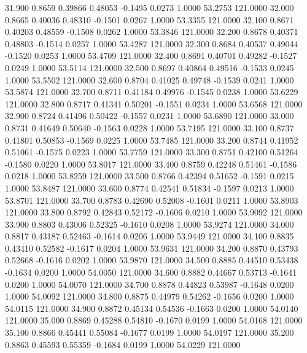   31.900   0.8659   0.39866   0.48053  -0.1495   0.0273   1.0000  53.2753 121.0000
  32.000   0.8665   0.40036   0.48310  -0.1501   0.0267   1.0000  53.3355 121.0000
  32.100   0.8671   0.40203   0.48559  -0.1508   0.0262   1.0000  53.3846 121.0000
  32.200   0.8678   0.40371   0.48803  -0.1514   0.0257   1.0000  53.4287 121.0000
  32.300   0.8684   0.40537   0.49044  -0.1520   0.0253   1.0000  53.4709 121.0000
  32.400   0.8691   0.40701   0.49282  -0.1527   0.0249   1.0000  53.5114 121.0000
  32.500   0.8697   0.40864   0.49516  -0.1533   0.0245   1.0000  53.5502 121.0000
  32.600   0.8704   0.41025   0.49748  -0.1539   0.0241   1.0000  53.5874 121.0000
  32.700   0.8711   0.41184   0.49976  -0.1545   0.0238   1.0000  53.6229 121.0000
  32.800   0.8717   0.41341   0.50201  -0.1551   0.0234   1.0000  53.6568 121.0000
  32.900   0.8724   0.41496   0.50422  -0.1557   0.0231   1.0000  53.6890 121.0000
  33.000   0.8731   0.41649   0.50640  -0.1563   0.0228   1.0000  53.7195 121.0000
  33.100   0.8737   0.41801   0.50853  -0.1569   0.0225   1.0000  53.7485 121.0000
  33.200   0.8744   0.41952   0.51061  -0.1575   0.0223   1.0000  53.7759 121.0000
  33.300   0.8751   0.42100   0.51264  -0.1580   0.0220   1.0000  53.8017 121.0000
  33.400   0.8759   0.42248   0.51461  -0.1586   0.0218   1.0000  53.8259 121.0000
  33.500   0.8766   0.42394   0.51652  -0.1591   0.0215   1.0000  53.8487 121.0000
  33.600   0.8774   0.42541   0.51834  -0.1597   0.0213   1.0000  53.8701 121.0000
  33.700   0.8783   0.42690   0.52008  -0.1601   0.0211   1.0000  53.8903 121.0000
  33.800   0.8792   0.42843   0.52172  -0.1606   0.0210   1.0000  53.9092 121.0000
  33.900   0.8803   0.43006   0.52325  -0.1610   0.0208   1.0000  53.9274 121.0000
  34.000   0.8817   0.43187   0.52463  -0.1614   0.0206   1.0000  53.9449 121.0000
  34.100   0.8835   0.43410   0.52582  -0.1617   0.0204   1.0000  53.9631 121.0000
  34.200   0.8870   0.43793   0.52668  -0.1616   0.0202   1.0000  53.9870 121.0000
  34.500   0.8885   0.44510   0.53438  -0.1634   0.0200   1.0000  54.0050 121.0000
  34.600   0.8882   0.44667   0.53713  -0.1641   0.0200   1.0000  54.0070 121.0000
  34.700   0.8878   0.44823   0.53987  -0.1648   0.0200   1.0000  54.0092 121.0000
  34.800   0.8875   0.44979   0.54262  -0.1656   0.0200   1.0000  54.0115 121.0000
  34.900   0.8872   0.45134   0.54536  -0.1663   0.0200   1.0000  54.0140 121.0000
  35.000   0.8869   0.45288   0.54810  -0.1670   0.0199   1.0000  54.0168 121.0000
  35.100   0.8866   0.45441   0.55084  -0.1677   0.0199   1.0000  54.0197 121.0000
  35.200   0.8863   0.45593   0.55359  -0.1684   0.0199   1.0000  54.0229 121.0000
